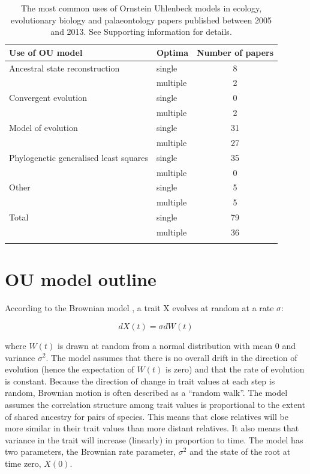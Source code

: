 \documentclass[a4paper,12pt]{article}
\begin{document}
    \begin{table}[!htbp]
      \begin{center}
        \caption{The most common uses of Ornstein Uhlenbeck models in ecology, evolutionary biology and palaeontology papers published between 2005 and 2013. See Supporting information for details.}
        \bigskip  
          \begin{tabular}{p{8cm}lc}
            \hline
            Use of OU model & Optima & Number of papers\\
            \hline
            Ancestral state reconstruction & single & 8\\
            & multiple & 2\\
            Convergent evolution & single & 0\\
            & multiple & 2\\
            Model of evolution & single & 31\\
            & multiple & 27\\
            Phylogenetic generalised least squares & single & 35\\
            & multiple & 0\\
            Other & single & 5\\
            & multiple & 5\\
            Total & single &  79\\
            & multiple & 36\\
            \hline
            \label{table.uses}
          \end{tabular}
      \end{center}
\end{table}
    
\section{OU model outline}
  
  According to the Brownian model \citep{cavalli1967,felsenstein1973maximum}, a trait X evolves at random at a rate $\sigma$:

      \begin{equation}
        dX(t) = \sigma dW(t)
      \end{equation}
    
    \noindent
    where $W(t)$ is drawn at random from a normal distribution with mean $0$ and variance $\sigma^2$. 
    The model assumes that there is no overall drift in the direction of evolution (hence the expectation of $W(t)$ is zero) and that the rate of evolution is constant. 
    Because the direction of change in trait values at each step is random, Brownian motion is often described as a ``random walk''.
    The model assumes the correlation structure among trait values is proportional to the extent of shared ancestry for pairs of species. 
    This means that close relatives will be more similar in their trait values than more distant relatives. It also means that variance in the trait will increase (linearly) in proportion to time. 
    The model has two parameters, the Brownian rate parameter, $\sigma^2$ and the state of the root at time zero, $X(0)$. 
\end{document}
